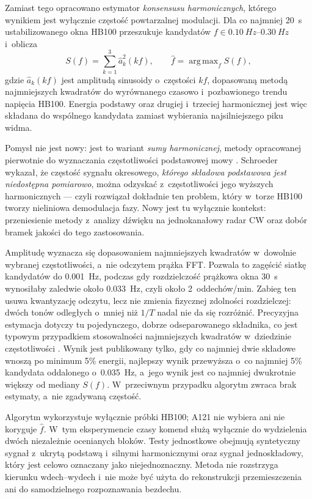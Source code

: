 \documentclass[12pt,a4paper,oneside]{report}
\begin{document}
Zamiast tego opracowano estymator \emph{konsensusu harmonicznych}, którego
wynikiem jest wyłącznie częstość powtarzalnej modulacji. Dla co najmniej
\SI{20}{s} ustabilizowanego okna HB100 przeszukuje kandydatów
$f\in\SIrange{0.10}{0.30}{Hz}$ i~oblicza
\begin{equation}
  S(f)=\sum_{k=1}^{3}\hat a_k^2(kf),\qquad
  \hat f=\mathop{\mathrm{arg\,max}}_f S(f),
  \label{eq:hb100-harmonic-consensus}
\end{equation}
gdzie $\hat a_k(kf)$ jest amplitudą sinusoidy o~częstości $kf$, dopasowaną
metodą najmniejszych kwadratów do wyrównanego czasowo i~pozbawionego trendu
napięcia HB100. Energia podstawy oraz drugiej i~trzeciej harmonicznej jest
więc składana do wspólnego kandydata zamiast wybierania najsilniejszego piku
widma.

Pomysł nie jest nowy: jest to wariant \emph{sumy harmonicznej}, metody
opracowanej pierwotnie do wyznaczania częstotliwości podstawowej mowy
\cite{noll1970}. Schroeder wykazał, że częstość sygnału okresowego,
\emph{którego składowa podstawowa jest niedostępna pomiarowo}, można odzyskać
z~częstotliwości jego wyższych harmonicznych \cite{schroeder1968} --- czyli
rozwiązał dokładnie ten problem, który w~torze HB100 tworzy nieliniowa
demodulacja fazy. Nowy jest tu wyłącznie kontekst: przeniesienie metody
z~analizy dźwięku na jednokanałowy radar CW oraz dobór bramek jakości do tego
zastosowania.

Amplitudę wyznacza się dopasowaniem najmniejszych kwadratów w~dowolnie wybranej
częstotliwości, a~nie odczytem prążka FFT. Pozwala to zagęścić siatkę
kandydatów do \SI{0.001}{Hz}, podczas gdy rozdzielczość prążkowa okna
\SI{30}{s} wynosiłaby zaledwie około \SI{0.033}{Hz}, czyli około
2~oddechów/min. Zabieg ten usuwa kwantyzację odczytu, lecz nie zmienia
fizycznej zdolności rozdzielczej: dwóch tonów odległych o~mniej niż $1/T$
nadal nie da się rozróżnić. Precyzyjna estymacja dotyczy tu pojedynczego,
dobrze odseparowanego składnika, co jest typowym przypadkiem stosowalności
najmniejszych kwadratów w~dziedzinie częstotliwości \cite{vanderplas2018}. Wynik jest publikowany tylko, gdy co najmniej dwie składowe wnoszą po
minimum 5\% energii, najlepszy wynik przewyższa o~co najmniej 5\% kandydata
oddalonego o~\SI{0.035}{Hz}, a~jego wynik jest co najmniej dwukrotnie większy
od mediany $S(f)$. W~przeciwnym przypadku algorytm zwraca brak estymaty, a~nie
zgadywaną częstość.

Algorytm wykorzystuje wyłącznie próbki HB100; A121 nie wybiera ani nie
koryguje $\hat f$. W~tym eksperymencie czasy komend służą wyłącznie do
wydzielenia dwóch niezależnie ocenianych bloków. Testy jednostkowe obejmują
syntetyczny sygnał z~ukrytą podstawą i~silnymi harmonicznymi oraz sygnał
jednoskładowy, który jest celowo oznaczany jako niejednoznaczny. Metoda nie
rozstrzyga kierunku wdech--wydech i~nie może być użyta do rekonstrukcji
przemieszczenia ani do samodzielnego rozpoznawania bezdechu.
\end{document}
